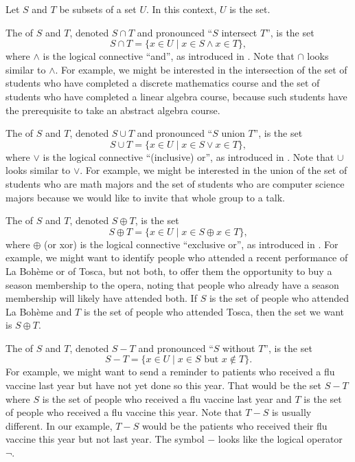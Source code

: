 \begin{defn}
\label{defn_set_ops}
    Let $S$ and $T$ be subsets of a set $U$.  In this context, $U$ is the  set.
        \begin{apart}
            \item The  of $S$ and $T$, denoted $S \cap T$ and pronounced ``$S$ intersect $T$'', is the set 
                $$S\cap T = \{x \in U \mid x \in S \land x \in T\},$$
            where $\land$ is the logical connective ``and'', as introduced in .  Note that $\cap$ looks similar to $\land$.
            For example, we might be interested in the intersection of the set of students who have completed a discrete mathematics course and the set of students who have completed a linear algebra course, because such students have the prerequisite to take an abstract algebra course.

            \item The  of $S$ and $T$, denoted $S \cup T$ and pronounced ``$S$ union $T$'', is the set 
                $$S\cup T = \{x \in U \mid x \in S \lor x \in T\},$$
            where $\lor$ is the logical connective ``(inclusive) or'', as introduced in .  Note that $\cup$ looks similar to $\lor$.
            For example, we might be interested in the union of the set of students who are math majors and the set of students who are computer science majors because we would like to invite that whole group to a talk.

            \item The  of $S$ and $T$, denoted $S \oplus T$, is the set
                $$S \oplus T= \{ x \in U \mid x \in S  \oplus x \in T\},$$
            where $\oplus$ (or xor) is the logical connective ``exclusive or'', as introduced in . For example, we might want to identify people who attended a recent performance of La Boh\`eme or of Tosca, but not both, to offer them the opportunity to buy a season membership to the opera, noting that people who already have a season membership will likely have attended both.  If $S$ is the set of people who attended La Boh\`eme and $T$ is the set of people who attended Tosca, then the set we want is $S \oplus T$.
            
            \item The  of $S$ and $T$, denoted $S - T$ and pronounced ``$S$ without $T$'', is the set
                $$S-T =\{x \in U \mid x \in S \text{ but } x\notin T\}.$$
            For example, we might want to send a reminder to patients who received a flu vaccine last year but have not yet done so this year. That would be the set $S -T$ where $S$ is the set of people who received a flu vaccine last year and $T$ is the set of people who received a flu vaccine this year.  Note that $T-S$ is usually different. In our example, $T-S$ would be the patients who received their flu vaccine this year but not last year. The symbol $-$ looks like the logical operator $\neg$.


\end{apart}
\end{defn}
